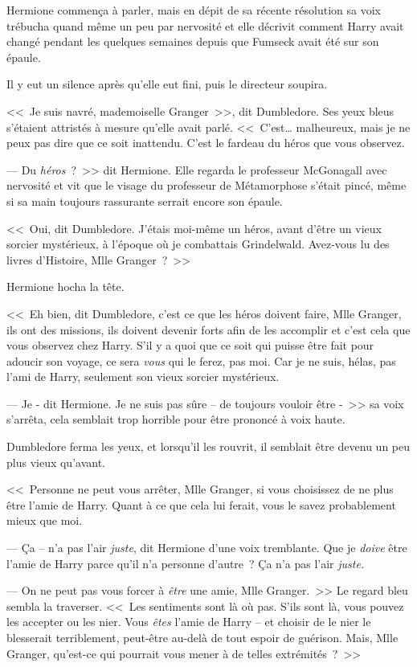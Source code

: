 Hermione commença à parler, mais en dépit de sa récente résolution sa voix trébucha quand même un peu par nervosité et elle décrivit comment Harry avait changé pendant les quelques semaines depuis que Fumseck avait été sur son épaule.

Il y eut un silence après qu'elle eut fini, puis le directeur soupira.

<<~Je suis navré, mademoiselle Granger~>>, dit Dumbledore. Ses yeux bleus s'étaient attristés à mesure qu'elle avait parlé. <<~C'est… malheureux, mais je ne peux pas dire que ce soit inattendu. C'est le fardeau du héros que vous observez.

--- Du \emph{héros}~?~>> dit Hermione. Elle regarda le professeur McGonagall avec nervosité et vit que le visage du professeur de Métamorphose s'était pincé, même si sa main toujours rassurante serrait encore son épaule.

<<~Oui, dit Dumbledore. J'étais moi-même un héros, avant d'être un vieux sorcier mystérieux, à l'époque où je combattais Grindelwald. Avez-vous lu des livres d'Histoire, Mlle Granger~?~>>

Hermione hocha la tête.

<<~Eh bien, dit Dumbledore, c'est ce que les héros doivent faire, Mlle Granger, ils ont des missions, ils doivent devenir forts afin de les accomplir et c'est cela que vous observez chez Harry. S'il y a quoi que ce soit qui puisse être fait pour adoucir son voyage, ce sera \emph{vous} qui le ferez, pas moi. Car je ne suis, hélas, pas l'ami de Harry, seulement son vieux sorcier mystérieux.

--- Je - dit Hermione. Je ne suis pas sûre -- de toujours vouloir être -~>> sa voix s'arrêta, cela semblait trop horrible pour être prononcé à voix haute.

Dumbledore ferma les yeux, et lorsqu'il les rouvrit, il semblait être devenu un peu plus vieux qu'avant.

<<~Personne ne peut vous arrêter, Mlle Granger, si vous choisissez de ne plus être l'amie de Harry. Quant à ce que cela lui ferait, vous le savez probablement mieux que moi.

--- Ça -- n'a pas l'air \emph{juste}, dit Hermione d'une voix tremblante. Que je \emph{doive} être l'amie de Harry parce qu'il n'a personne d'autre~? Ça n'a pas l'air \emph{juste.}

--- On ne peut pas vous forcer à \emph{être} une amie, Mlle Granger.~>> Le regard bleu sembla la traverser. <<~Les sentiments sont là où pas. S'ils sont là, vous pouvez les accepter ou les nier. Vous \emph{êtes} l'amie de Harry -- et choisir de le nier le blesserait terriblement, peut-être au-delà de tout espoir de guérison. Mais, Mlle Granger, qu'est-ce qui pourrait vous mener à de telles extrémités~?~>>

